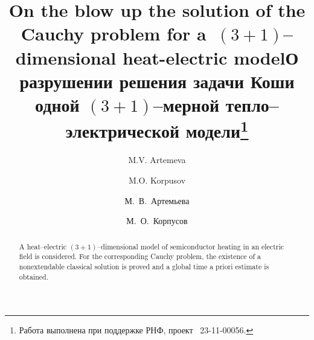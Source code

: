 \begin{englishtitle} %
\title{On the blow up the solution of the Cauchy problem for a~$(3+1)$--dimensional heat-electric model}
\author{M.V. Artemeva  \and  M.O. Korpusov 
}

\maketitle

\begin{abstract}
A heat–electric $(3+1)$--dimensional model of semiconductor heating in an electric field is considered. For the corresponding Cauchy problem, the existence of a nonextendable classical solution is proved and a global time a priori estimate is obtained.

\end{abstract}
\end{englishtitle}

\iffalse
%
%


\documentclass[12pt]{llncs}  


\usepackage{iftex}

\ifPDFTeX
\usepackage[T2A]{fontenc}
\usepackage[utf8]{inputenc} %
\usepackage[english,russian]{babel}
\fi

\usepackage{todonotes} 

\usepackage[russian]{nla}


\fi

\title{О разрушении решения задачи Коши одной $(3+1)$--мерной тепло--электрической модели\thanks{Работа выполнена при поддержке РНФ, проект \textnumero~23-11-00056.}}
\author{М.~В.~Артемьева   \and  М.~О.~Корпусов 
}

